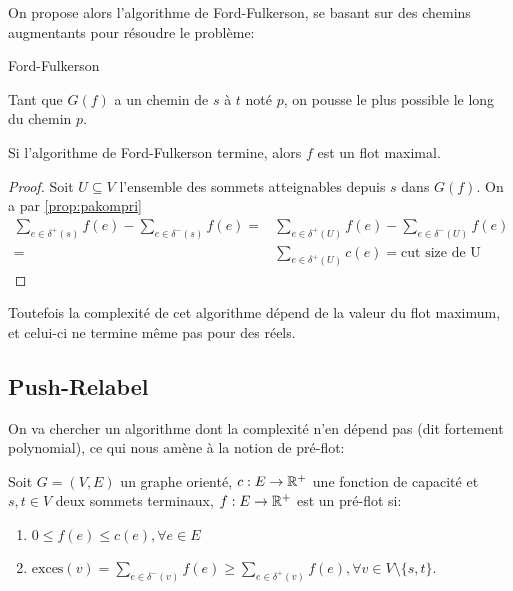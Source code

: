 \documentclass[math, info]{cours}
\begin{document}
On propose alors l'algorithme de Ford-Fulkerson, se basant sur des chemins augmentants pour résoudre le problème:
\begin{algorithm}
	\caption{Ford-Fulkerson}
	\label{alg:fordfulkerson}
	Tant que $G(f)$ a un chemin de $s$ à $t$ noté $p$, on pousse le plus possible le long du chemin $p$.
\end{algorithm}

\begin{thm}
	Si l'algorithme de Ford-Fulkerson termine, alors $f$ est un flot maximal.
\end{thm}

\begin{proof}
	Soit $U \subseteq V$ l'ensemble des sommets atteignables depuis $s$ dans $G(f)$. On a par \ref{prop:pakompri}
	\begin{equation*}
		\begin{aligned}
			\sum_{e \in \delta^{+}(s)} f(e) - \sum_{e\in \delta^{-}(s)}f(e) = & \sum_{e \in \delta^{+}(U)}f(e) - \sum_{e \in \delta^{-}(U)}f(e) \\
			=                                                                 & \sum_{e\in \delta^{+}(U)} c(e) = \text{cut size de U}
		\end{aligned}
	\end{equation*}
\end{proof}
Toutefois la complexité de cet algorithme dépend de la valeur du flot maximum, et celui-ci ne termine même pas pour des réels.

\subsection{Push-Relabel}
On va chercher un algorithme dont la complexité n'en dépend pas (dit fortement polynomial), ce qui nous amène à la notion de pré-flot:
\begin{definition}
	Soit $G = \left(V, E\right)$ un graphe orienté, $c: E \to \mathbb{R}^{+}$ une fonction de capacité et $s, t \in V$ deux sommets terminaux,
	$f: E\to \mathbb{R}^{+}$ est un pré-flot si:
	\begin{enumerate}
		\item $0 \leq f(e) \leq c(e), \forall e \in E$
		\item $\mathrm{exces}(v) = \sum_{e \in \delta^{-}(v)} f(e) \geq \sum_{e \in \delta^{+}(v)} f(e), \forall v \in V \setminus \{s, t\}$.
	\end{enumerate}
	\label{def:preflot}
\end{definition}
\end{document}
